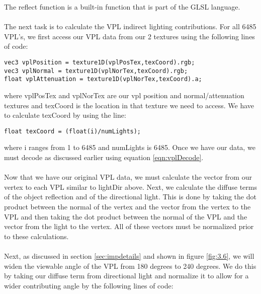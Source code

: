The reflect function is a built-in function that is part of the GLSL language.  

\paragraph{}
The next task is to calculate the VPL indirect lighting contributions.  For all 6485 VPL's, we first access our VPL data from our 2 textures using the following lines of code:

\begin{lstlisting}
vec3 vplPosition = texture1D(vplPosTex,texCoord).rgb;
vec3 vplNormal = texture1D(vplNorTex,texCoord).rgb;
float vplAttenuation = texture1D(vplNorTex,texCoord).a;
\end{lstlisting}

where vplPosTex and vplNorTex are our vpl position and normal/attenuation textures and texCoord is the location in that texture we need to access.  We have to calculate texCoord by using the line:

\begin{lstlisting}
float texCoord = (float(i)/numLights);
\end{lstlisting}

where i ranges from 1 to 6485 and numLights is 6485.  Once we have our data, we must decode as discussed earlier using equation \ref{eqn:vplDecode}.  

\paragraph{}
Now that we have our original VPL data, we must calculate the vector from our vertex to each VPL similar to lightDir above.  Next, we calculate the diffuse terms of the object reflection and of the directional light.  This is done by taking the dot product between the normal of the vertex and the vector from the vertex to the VPL and then taking the dot product between the normal of the VPL and the vector from the light to the vertex.  All of these vectors must be normalized prior to these calculations.

\paragraph{}
Next, as discussed in section \ref{sec:impdetails} and shown in figure \ref{fig:3.6}, we will widen the viewable angle of the VPL from 180 degrees to 240 degrees.  We do this by taking our diffuse term from directional light and normalize it to allow for a wider contributing angle by the following lines of code:

